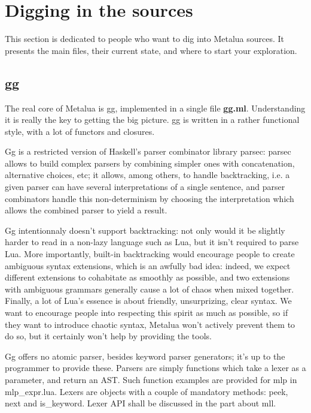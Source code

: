 \section{Digging in the sources}

This section is dedicated to people who want to dig into Metalua
sources. It presents the main files, their current state, and where to
start your exploration.

\subsection{gg}

The real core of Metalua is gg, implemented in a single file {\bf
  gg.ml}. Understanding it is really the key to getting the big
picture. gg is written in a rather functional style, with a lot of
functors and closures.

Gg is a restricted version of Haskell's parser combinator library
parsec: parsec allows to build complex parsers by combining simpler
ones with concatenation, alternative choices, etc; it allows, among
others, to handle backtracking, i.e. a given parser can have several
interpretations of a single sentence, and parser combinators handle
this non-determinism by choosing the interpretation which allows the
combined parser to yield a result.

Gg intentionnaly doesn't support backtracking: not only would it be
slightly harder to read in a non-lazy language such as Lua, but it
isn't required to parse Lua. More importantly, built-in backtracking
would encourage people to create ambiguous syntax extensions, which is
an awfully bad idea: indeed, we expect different extensions to
cohabitate as smoothly as possible, and two extensions with ambiguous
grammars generally cause a lot of chaos when mixed together. Finally,
a lot of Lua's essence is about friendly, unsurprizing, clear
syntax. We want to encourage people into respecting this spirit as
much as possible, so if they want to introduce chaotic syntax, Metalua
won't actively prevent them to do so, but it certainly won't help by
providing the tools.

Gg offers no atomic parser, besides keyword parser generators; it's up
to the programmer to provide these. Parsers are simply functions which
take a lexer as a parameter, and return an AST. Such function examples
are provided for mlp in mlp\_expr.lua. Lexers are objects with a
couple of mandatory methods: peek, next and is\_keyword. Lexer API
shall be discussed in the part about mll.

